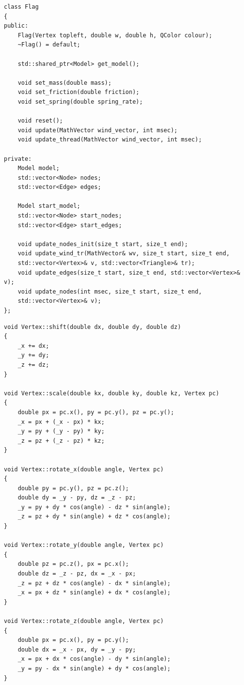 \begin{lstlisting}[caption=Класс <<флаг>> Flag, label=list:work_render]
class Flag
{
public:
	Flag(Vertex topleft, double w, double h, QColor colour);
	~Flag() = default;
	
	std::shared_ptr<Model> get_model();
	
	void set_mass(double mass);
	void set_friction(double friction);
	void set_spring(double spring_rate);
	
	void reset();
	void update(MathVector wind_vector, int msec);
	void update_thread(MathVector wind_vector, int msec);

private:
	Model model;
	std::vector<Node> nodes;
	std::vector<Edge> edges;
	
	Model start_model;
	std::vector<Node> start_nodes;
	std::vector<Edge> start_edges;
	
	void update_nodes_init(size_t start, size_t end);
	void update_wind_tr(MathVector& wv, size_t start, size_t end,
	std::vector<Vertex>& v, std::vector<Triangle>& tr);
	void update_edges(size_t start, size_t end, std::vector<Vertex>& v);
	void update_nodes(int msec, size_t start, size_t end,
	std::vector<Vertex>& v);
};
\end{lstlisting}

\begin{lstlisting}[caption=Функции аффинных преобразований, label=list:affin]
void Vertex::shift(double dx, double dy, double dz)
{
	_x += dx;
	_y += dy;
	_z += dz;
}

void Vertex::scale(double kx, double ky, double kz, Vertex pc)
{
	double px = pc.x(), py = pc.y(), pz = pc.y();
	_x = px + (_x - px) * kx;
	_y = py + (_y - py) * ky;
	_z = pz + (_z - pz) * kz;
}

void Vertex::rotate_x(double angle, Vertex pc)
{
	double py = pc.y(), pz = pc.z();
	double dy = _y - py, dz = _z - pz;
	_y = py + dy * cos(angle) - dz * sin(angle);
	_z = pz + dy * sin(angle) + dz * cos(angle);
}

void Vertex::rotate_y(double angle, Vertex pc)
{
	double pz = pc.z(), px = pc.x();
	double dz = _z - pz, dx = _x - px;
	_z = pz + dz * cos(angle) - dx * sin(angle);
	_x = px + dz * sin(angle) + dx * cos(angle);
}

void Vertex::rotate_z(double angle, Vertex pc)
{
	double px = pc.x(), py = pc.y();
	double dx = _x - px, dy = _y - py;
	_x = px + dx * cos(angle) - dy * sin(angle);
	_y = py - dx * sin(angle) + dy * cos(angle);
}
\end{lstlisting}

